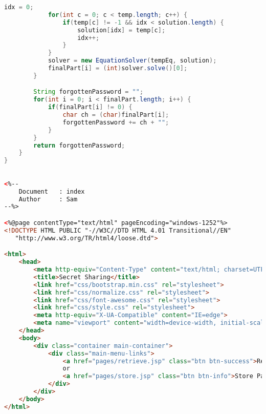 \begin{lstlisting}[language=Java,basicstyle=\tiny,caption=SecretSharing.java]
            idx = 0;
            for(int c = 0; c < temp.length; c++) {
                if(temp[c] != -1 && idx < solution.length) {
                    solution[idx] = temp[c];
                    idx++;
                }
            }
            solver = new EquationSolver(tempEq, solution);
            finalPart[i] = (int)solver.solve()[0];
        }

        String forgottenPassword = "";
        for(int i = 0; i < finalPart.length; i++) {
            if(finalPart[i] != 0) {
                char ch = (char)finalPart[i];
                forgottenPassword += ch + "";
            }
        }
        return forgottenPassword;
    }
}

\end{lstlisting}

\begin{lstlisting}[language=HTML,basicstyle=\tiny,caption=index.jsp]

<%-- 
    Document   : index
    Author     : Sam
--%>

<%@page contentType="text/html" pageEncoding="windows-1252"%>
<!DOCTYPE HTML PUBLIC "-//W3C//DTD HTML 4.01 Transitional//EN"
   "http://www.w3.org/TR/html4/loose.dtd">

<html>
    <head>
        <meta http-equiv="Content-Type" content="text/html; charset=UTF-8">
        <title>Secret Sharing</title>
        <link href="css/bootstrap.min.css" rel="stylesheet">
        <link href="css/normalize.css" rel="stylesheet">
        <link href="css/font-awesome.css" rel="stylesheet">
        <link href="css/style.css" rel="stylesheet">
        <meta http-equiv="X-UA-Compatible" content="IE=edge">
        <meta name="viewport" content="width=device-width, initial-scale=1">
    </head>
    <body>
        <div class="container main-container">
            <div class="main-menu-links">
                <a href="pages/retrieve.jsp" class="btn btn-success">Retrieve Password</a>
                or
                <a href="pages/store.jsp" class="btn btn-info">Store Password</a>
            </div>
        </div>
    </body>
</html>

\end{lstlisting}

